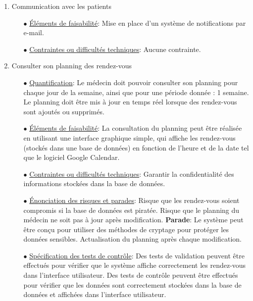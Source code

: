 \documentclass[a4paper]{report}
\begin{document}
\begin{enumerate}
    \item Communication avec les patients\newline
    \begin{itemize}
        \item[$\bullet$] \underline{Éléments de faisabilité}: Mise en place d’un système de notifications par e-mail. 
        \item[$\bullet$] \underline{Contraintes ou difficultés techniques}: Aucune contrainte. \newline
    \end{itemize}

    \item Consulter son planning des rendez-vous\newline
    \begin{itemize}
        \item[$\bullet$] \underline{Quantification}: Le médecin doit pouvoir consulter son planning pour chaque jour de la semaine, ainsi que pour une période donnée : 1 semaine.
		Le planning doit être mis à jour en temps réel lorsque des rendez-vous sont ajoutés ou supprimés.
        \item[$\bullet$] \underline{Éléments de faisabilité}: La consultation du planning peut être réalisée en utilisant une interface graphique simple, qui affiche les rendez-vous (stockés dans une base de données) 
        en fonction de l'heure et de la date tel que le logiciel Google Calendar.
        \item[$\bullet$] \underline{Contraintes ou difficultés techniques}: Garantir la confidentialité des informations stockées dans la base de données.
        \item[$\bullet$] \underline{Énonciation des risques et parades}:  Risque que les rendez-vous soient compromis si la base de données est piratée. Risque que le planning du médecin ne soit pas à jour après modification.\newline
        \textbf{Parade}: Le système peut être conçu pour utiliser des méthodes de cryptage pour protéger les données sensibles. Actualisation du planning après chaque modification.
        \item[$\bullet$] \underline{Spécification des tests de contrôle}: Des tests de validation peuvent être effectués pour vérifier que le système affiche correctement les rendez-vous dans l'interface utilisateur. Des tests de contrôle 
        peuvent être effectués pour vérifier que les données sont correctement stockées dans la base de données et affichées dans l'interface utilisateur.\newline
    \end{itemize} 


\end{enumerate}
\end{document}
